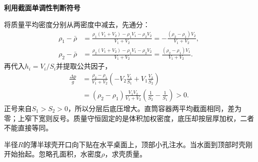 \begin{solution}
\par\medskip{}\noindent\textbf{利用截面单调性判断符号}\par\nobreak
将质量平均密度分别从两密度中减去，先通分：
\begin{align*}
\rho_1-\bar\rho
&=\frac{\rho_1(V_1+V_2)-\rho_1V_1-\rho_2V_2}{V_1+V_2}
=-\frac{(\rho_2-\rho_1)V_2}{V_1+V_2},\\
\rho_2-\bar\rho
&=\frac{\rho_2(V_1+V_2)-\rho_1V_1-\rho_2V_2}{V_1+V_2}
=\frac{(\rho_2-\rho_1)V_1}{V_1+V_2}.
\end{align*}
再代入$h_i=V_i/S_i$并提取公共因子，
\begin{align*}
\frac{\Delta p}{g}
&=\frac{\rho_2-\rho_1}{V_1+V_2}
\left(-V_2\frac{V_1}{S_1}+V_1\frac{V_2}{S_2}\right)\\
&=(\rho_2-\rho_1)\frac{V_1V_2}{V_1+V_2}
\left(\frac1{S_2}-\frac1{S_1}\right)>0.
\end{align*}
正号来自$S_1>S_2>0$，所以分层后底压增大。直筒容器两平均截面相同，差为零；上窄下宽则反号。质量守恒固定的是体积加权密度，底压却按层厚加权，二者不能直接等同。\end{solution}
\begin{question}\begin{example}[半球壳何时被水顶起]\label{s5:example:4}
半径$R$的薄半球壳开口向下贴在水平桌面上，顶部小孔注水。当水面到顶部时壳刚开始抬起。忽略孔面积，水密度$\rho$，求壳质量。
\end{example}
\end{question}
